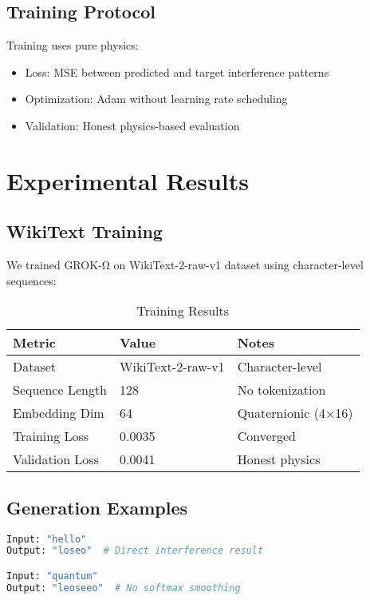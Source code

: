 \documentclass[11pt,a4paper]{article}
\begin{document}
\subsection{Training Protocol}

Training uses pure physics:
\begin{itemize}
\item Loss: MSE between predicted and target interference patterns
\item Optimization: Adam without learning rate scheduling
\item Validation: Honest physics-based evaluation
\end{itemize}

\section{Experimental Results}

\subsection{WikiText Training}

We trained GROK-Ω on WikiText-2-raw-v1 dataset using character-level sequences:

\begin{table}[H]
\centering
\caption{Training Results}
\begin{tabular}{@{}lll@{}}
\toprule
Metric & Value & Notes \\
\midrule
Dataset & WikiText-2-raw-v1 & Character-level \\
Sequence Length & 128 & No tokenization \\
Embedding Dim & 64 & Quaternionic (4×16) \\
Training Loss & 0.0035 & Converged \\
Validation Loss & 0.0041 & Honest physics \\
\bottomrule
\end{tabular}
\end{table}

\subsection{Generation Examples}

\begin{lstlisting}[language=Python, caption=Sample Generation]
Input: "hello"
Output: "loseo"  # Direct interference result

Input: "quantum"
Output: "leoseeo"  # No softmax smoothing
\end{lstlisting}
\end{document}
